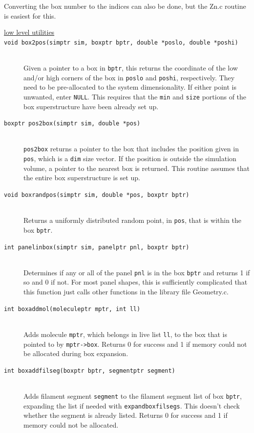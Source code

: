 \documentclass {scrbook}
\newcommand {\ttt} {\texttt}
\begin{document}
Converting the box number to the indices can also be done, but the Zn.c routine is easiest for this.

\begin{description}

\item[\underline{low level utilities}]

\item[\ttt{void box2pos(simptr sim, boxptr bptr, double *poslo, double *poshi)}]
\hfill \\
Given a pointer to a box in \ttt{bptr}, this returns the coordinate of the low and/or high corners of the box in \ttt{poslo} and \ttt{poshi}, respectively. They need to be pre-allocated to the system dimensionality. If either point is unwanted, enter \ttt{NULL}. This requires that the \ttt{min} and \ttt{size} portions of the box superstructure have been already set up.

\item[\ttt{boxptr pos2box(simptr sim, double *pos)}]
\hfill \\
\ttt{pos2box} returns a pointer to the box that includes the position given in \ttt{pos}, which is a \ttt{dim} size vector. If the position is outside the simulation volume, a pointer to the nearest box is returned. This routine assumes that the entire box superstructure is set up.

\item[\ttt{void boxrandpos(simptr sim, double *pos, boxptr bptr)}]
\hfill \\
Returns a uniformly distributed random point, in \ttt{pos}, that is within the box \ttt{bptr}.

\item[\ttt{int panelinbox(simptr sim, panelptr pnl, boxptr bptr)}]
\hfill \\
Determines if any or all of the panel \ttt{pnl} is in the box \ttt{bptr} and returns 1 if so and 0 if not. For most panel shapes, this is sufficiently complicated that this function just calls other functions in the library file Geometry.c.

\item[\ttt{int boxaddmol(moleculeptr mptr, int ll)}]
\hfill \\
Adds molecule \ttt{mptr}, which belongs in live list \ttt{ll}, to the box that is pointed to by \ttt{mptr->box}. Returns 0 for success and 1 if memory could not be allocated during box expansion.

\item[\ttt{int boxaddfilseg(boxptr bptr, segmentptr segment)}] %
\hfill \\
Adds filament segment \ttt{segment} to the filament segment list of box \ttt{bptr}, expanding the list if needed with \ttt{expandboxfilsegs}. This doesn't check whether the segment is already listed. Returns 0 for success and 1 if memory could not be allocated.


\end{description}
\end{document}
